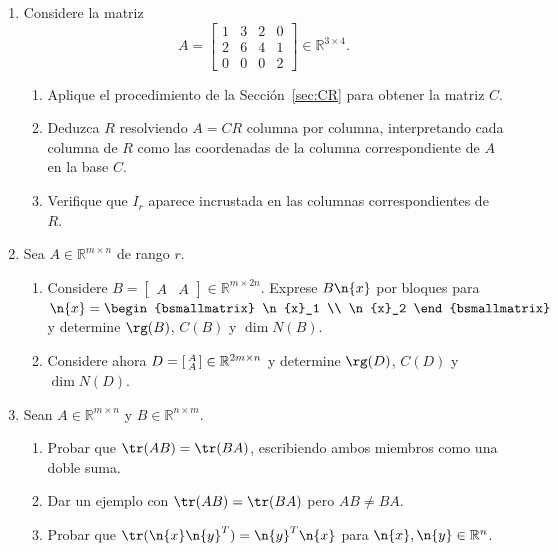 \begin{enumerate}[leftmargin=*,label=\textbf{1.\arabic*}]
\item Considere la matriz
\[
A = \begin{bmatrix} 1 & 3 & 2 & 0 \\ 2 & 6 & 4 & 1 \\ 0 & 0 & 0 & 2 \end{bmatrix} \in\mathbb{R}^{3\times 4}.
\]
\begin{enumerate}[label=\alph*)]
    \item Aplique el procedimiento de la Sección~\ref{sec:CR} para obtener la matriz $C$.
    \item Deduzca $R$ resolviendo $A = CR$ columna por columna, interpretando cada columna de $R$ como las coordenadas de la columna correspondiente de $A$ en la base $C$.
    \item Verifique que $I_r$ aparece incrustada en las columnas correspondientes de $R$.
\end{enumerate}

\item Sea $A \in \mathbb{R}^{m \times n}$ de rango $r$.
\begin{enumerate}[label=\alph*)]
    \item Considere $B = \begin{bmatrix} A & A \end{bmatrix} \in \mathbb{R}^{m \times 2n}$. Exprese $B\n{x}$ por bloques para $\n{x} = \begin{bsmallmatrix} \n{x}_1 \\ \n{x}_2 \end{bsmallmatrix}$ y determine $\rg(B)$, $C(B)$ y $\dim N(B)$.
    \item Considere ahora $D = \begin{bsmallmatrix} A \\ A \end{bsmallmatrix} \in \mathbb{R}^{2m \times n}$ y determine $\rg(D)$, $C(D)$ y $\dim N(D)$.
\end{enumerate}

\item\label{ej:traza} Sean $A \in \mathbb{R}^{m\times n}$ y $B\in\mathbb{R}^{n\times m}$.
\begin{enumerate}[label=\alph*)]
    \item Probar que $\tr(AB) = \tr(BA)$, escribiendo ambos miembros como una doble suma.
    \item Dar un ejemplo con $\tr(AB)=\tr(BA)$ pero $AB \neq BA$.
    \item Probar que $\tr(\n{x}\n{y}^T) = \n{y}^T\n{x}$ para $\n{x},\n{y}\in\mathbb{R}^n$.
\end{enumerate}


\end{enumerate}
